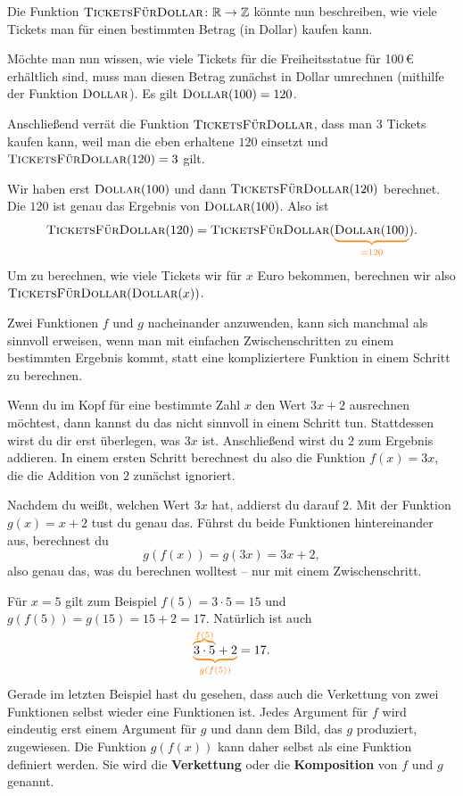 \documentclass[../../main.tex]{subfiles}
\begin{document}
\begin{example}{}
    Die Funktion $\textsc{TicketsFürDollar}\colon\mathbb{R}\rightarrow\mathbb{Z}$ könnte nun beschreiben, wie viele Tickets man für einen bestimmten Betrag (in Dollar) kaufen kann.

    Möchte man nun wissen, wie viele Tickets für die Freiheitsstatue für 100\,€ erhältlich sind, muss man diesen Betrag zunächst in Dollar umrechnen (mithilfe der Funktion $\textsc{Dollar}$). Es gilt $\textsc{Dollar}(100)=120$. 
    
    Anschließend verrät die Funktion $\textsc{TicketsFürDollar}$, dass man $3$ Tickets kaufen kann, weil man die eben erhaltene $120$ einsetzt und $\textsc{TicketsFürDollar}(120)=3$ gilt.
    
    Wir haben erst $\textsc{Dollar}(100)$ und dann $\textsc{TicketsFürDollar}(120)$ berechnet. Die $120$ ist genau das Ergebnis von $\textsc{Dollar}(100)$. Also ist \[\textsc{TicketsFürDollar}(120)=\textsc{TicketsFürDollar}(\colorbrace{\textsc{Dollar}(100)}{=120}).\]
    
    Um zu berechnen, wie viele Tickets wir für $x$ Euro bekommen, berechnen wir also $\textsc{TicketsFürDollar}(\textsc{Dollar}(x))$.
\end{example}

Zwei Funktionen $f$ und $g$ nacheinander anzuwenden, kann sich manchmal als sinnvoll erweisen, wenn man mit einfachen Zwischenschritten zu einem bestimmten Ergebnis kommt, statt eine kompliziertere Funktion in einem Schritt zu berechnen.

\begin{example}{}
    Wenn du im Kopf für eine bestimmte Zahl $x$ den Wert $3x+2$ ausrechnen möchtest, dann kannst du das nicht sinnvoll in einem Schritt tun. Stattdessen wirst du dir erst überlegen, was $3x$ ist. Anschließend wirst du $2$ zum Ergebnis addieren. In einem ersten Schritt berechnest du also die Funktion $f(x)=3x$, die die Addition von $2$ zunächst ignoriert.
    
    Nachdem du weißt, welchen Wert $3x$ hat, addierst du darauf $2$. Mit der Funktion $g(x)=x+2$ tust du genau das. Führst du beide Funktionen hintereinander aus, berechnest du \[g(f(x))=g(3x)=3x+2,\] also genau das, was du berechnen wolltest -- nur mit einem Zwischenschritt.
    
    Für $x=5$ gilt zum Beispiel $f(5)=3\cdot 5=15$ und $g(f(5))=g(15)=15+2=17$. Natürlich ist auch \[\colorbrace{\colorobrace{3\cdot 5}{f(5)}+2}{g(f(5))}=17.\]
\end{example}

Gerade im letzten Beispiel hast du gesehen, dass auch die Verkettung von zwei Funktionen selbst wieder eine Funktionen ist. Jedes Argument für $f$ wird eindeutig erst einem Argument für $g$ und dann dem Bild, das $g$ produziert, zugewiesen. Die Funktion $g(f(x))$ kann daher selbst als eine Funktion definiert werden. Sie wird die \textbf{Verkettung} oder die \textbf{Komposition} von $f$ und $g$ genannt.
\end{document}
